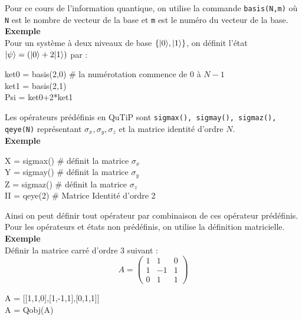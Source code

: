Pour ce cours de l'information quantique, on utilise la commande 
\texttt{basis(N,m)} où \texttt{N} est le nombre de vecteur de la base et 
\texttt{m} est le numéro du vecteur de la base.\\
\textbf{Exemple}\\
Pour un système à deux niveaux de base $\{\vert0\rangle,\vert1\rangle\}$, on définit l'état 
$\vert\psi\rangle=(\vert0\rangle+2\vert1\rangle)$ par :\\
\begin{tt}
ket0 = basis(2,0) \# la numérotation commence de $0$ à $N-1$\\
ket1 = basis(2,1) \\
Psi = ket0+2*ket1
\end{tt}

Les opérateurs prédéfinis en QuTiP sont \texttt{sigmax(), sigmay(), sigmaz(), 
qeye(N)} représentant $\sigma_x,\sigma_y,\sigma_z$ et la matrice identité 
d'ordre $N$.\\
\textbf{Exemple}\\
\begin{tt}
X = sigmax() \# définit la matrice $\sigma_x$\\
Y = sigmay() \# définit la matrice $\sigma_y$\\
Z = sigmaz() \# définit la matrice $\sigma_z$\\
II = qeye(2) \# Matrice Identité d'ordre 2\\
\end{tt}

Ainsi on peut définir tout opérateur par combinaison de ces opérateur 
prédéfinis. Pour les opérateurs et états non prédéfinis, on utilise la 
définition matricielle.\\
\textbf{Exemple}\\
Définir la matrice carré d'ordre 3 suivant :
\begin{equation}
A =
\begin{pmatrix}
1&1&0\\1&-1&1\\0&1&1
\end{pmatrix}
\end{equation}
\begin{tt}
A = [[1,1,0],[1,-1,1],[0,1,1]]\\
A = Qobj(A)
\end{tt}

